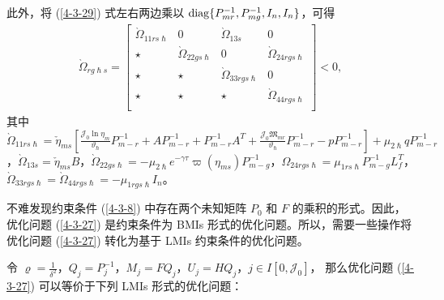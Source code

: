 此外，将 (\ref{4-3-29}) 式左右两边乘以 ${\rm diag}\{P_{mr}^{-1}, P_{mg}^{-1}, I_n,I_n\}$，可得 
\begin{align*} 
\grave{\varOmega}_{rg\hslash s}= \left[ \begin{array}{cccc }
\grave{\varOmega}_{11rs\hslash} &0& \grave{\varOmega}_{13s}& 0\\
\star&\grave{\varOmega}_{22gs\hslash} &0 &\grave{\varOmega}_{24rgs\hslash} \\
\star&\star&\grave{\varOmega}_{33rgs\hslash}&0  \\
\star&\star&  \star&\grave{\varOmega}_{44rgs\hslash} \\
\end{array}
\right]< 0,
\end{align*} 
其中
$
\grave{\varOmega}_{11rs\hslash}= 
 \check{\eta}_{ms}[\frac{\mathcal{J}_0 \ln \eta_m}{\vartheta_{\hslash}} P^{-1}_{m-r}+AP^{-1}_{m-r}+P^{-1}_{m-r}A^T 
+\frac{\mathcal{J}_0\mathfrak{M}_{mr}}{\vartheta_{\hslash}}P^{-1}_{m-r}-pP^{-1}_{m-r}]
+\mu_{2\hslash} qP^{-1}_{m-r}$，$
\grave{\varOmega}_{13s}=  \check{\eta}_{ms} B$，$ 
\grave{\varOmega}_{22 gs\hslash }= -\mu_{2\hslash}
e^{-\gamma\tau}\varpi(\eta_{ms})P^{-1}_{m-g}$，$ 
\varOmega_{24rgs\hslash}=  \mu_{1rs\hslash}P^{-1}_{m-g}L^T_f$，$
\grave{\varOmega}_{33rgs\hslash}=  \grave{\varOmega}_{44rgs\hslash}= -\mu_{1rgs\hslash}I_n 
$。

不难发现约束条件 (\ref{4-3-8}) 中存在两个未知矩阵 $P_0$ 和 $F$ 的乘积的形式。因此，优化问题 (\ref{4-3-27}) 是约束条件为 BMIs 形式的优化问题。所以，需要一些操作将优化问题 (\ref{4-3-27}) 转化为基于 LMIs 约束条件的优化问题。 


令 $\varrho=\frac{1}{\delta^2}$，$Q_j=P^{-1}_j$，$M_j=FQ_j$，$U_j=HQ_j$，$j\in I[0,\mathcal{J }_0]$， 那么优化问题 (\ref{4-3-27}) 可以等价于下列 LMIs 形式的优化问题：

